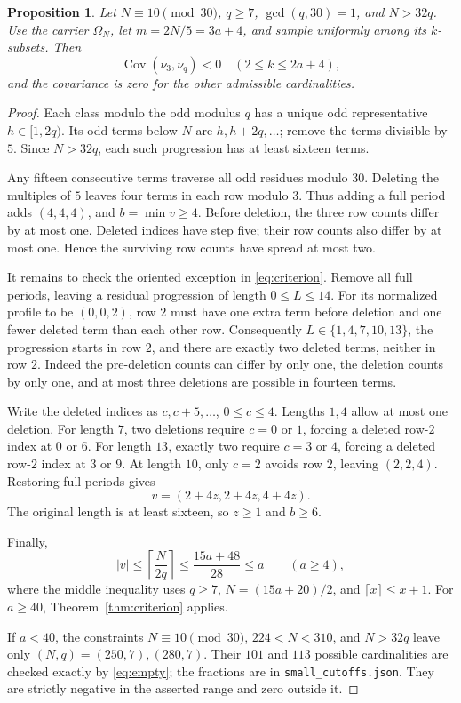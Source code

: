 \documentclass[11pt,a4paper]{article}
\newtheorem{proposition}[theorem]{Proposition}
\theoremstyle{remark}
\DeclareMathOperator{\Cov}{Cov}
\numberwithin{equation}{section}
\begin{document}
\begin{proposition}\label{prop:small}
Let \(N\equiv10\pmod{30}\), \(q\ge7\), \(\gcd(q,30)=1\), and \(N>32q\).
Use the carrier \(\Omega_N\), let \(m=2N/5=3a+4\), and sample uniformly
among its \(k\)-subsets. Then
\[
 \Cov(\nu_3,\nu_q)<0\quad(2\le k\le2a+4),
\]
and the covariance is zero for the other admissible cardinalities.
\end{proposition}
\begin{proof}
Each class modulo the odd modulus \(q\) has a unique odd representative
\(h\in[1,2q)\). Its odd terms below \(N\) are
\(h,h+2q,\ldots\); remove the terms divisible by \(5\).
Since \(N>32q\), each such progression has at least sixteen terms.

Any fifteen consecutive terms traverse all odd residues modulo \(30\).
Deleting the multiples of \(5\) leaves four terms in each row modulo \(3\).
Thus adding a full period adds \((4,4,4)\), and \(b=\min v\ge4\).
Before deletion, the three row counts differ by at most one.
Deleted indices have step five; their row counts also differ by at
most one. Hence the surviving row counts have spread at most two.

It remains to check the oriented exception in \eqref{eq:criterion}.
Remove all full periods, leaving a residual progression of length
\(0\le L\le14\). For its normalized profile to be \((0,0,2)\),
row \(2\) must have one extra term before deletion and one fewer
deleted term than each other row. Consequently
\(L\in\{1,4,7,10,13\}\), the progression starts in row \(2\), and
there are exactly two deleted terms, neither in row \(2\).
Indeed the pre-deletion counts can differ by only one, the
deletion counts by only one, and at most three deletions are
possible in fourteen terms.

Write the deleted indices as \(c,c+5,\ldots\), \(0\le c\le4\).
Lengths \(1,4\) allow at most one deletion.
For length \(7\), two deletions require \(c=0\) or \(1\), forcing
a deleted row-\(2\) index at \(0\) or \(6\).
For length \(13\), exactly two require \(c=3\) or \(4\), forcing
a deleted row-\(2\) index at \(3\) or \(9\).
At length \(10\), only \(c=2\) avoids row \(2\), leaving \((2,2,4)\).
Restoring full periods gives
\[
 v=(2+4z,2+4z,4+4z).
\]
The original length is at least sixteen, so \(z\ge1\) and \(b\ge6\).

Finally,
\[
 |v|\le\left\lceil\frac{N}{2q}\right\rceil
 \le\frac{15a+48}{28}\le a\qquad(a\ge4),
\]
where the middle inequality uses \(q\ge7\), \(N=(15a+20)/2\), and
\(\lceil x\rceil\le x+1\). For \(a\ge40\), Theorem~\ref{thm:criterion}
applies.

If \(a<40\), the constraints \(N\equiv10\pmod{30}\),
\(224<N<310\), and \(N>32q\) leave only
\((N,q)=(250,7),(280,7)\).
Their \(101\) and \(113\) possible cardinalities are checked exactly
by \eqref{eq:empty}; the fractions are in
\texttt{small\_cutoffs.json}. They are strictly negative in the
asserted range and zero outside it.
\end{proof}
\end{document}

